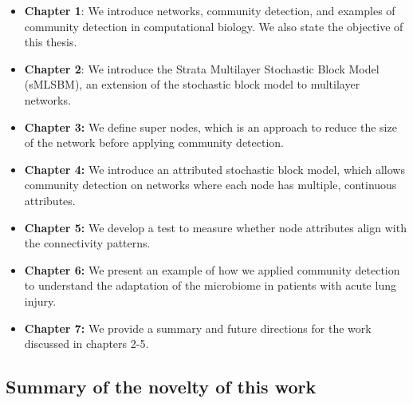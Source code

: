 \begin{itemize}
\item {\bf Chapter 1}: We introduce networks, community detection, and examples of community detection in computational biology. We also state the objective of this thesis.
\item {\bf Chapter 2}: We introduce the Strata Multilayer Stochastic Block Model (sMLSBM), an extension of the stochastic block model to multilayer networks. 
\item {\bf Chapter 3:} We define super nodes, which is an approach to reduce the size of the network before applying community detection.
\item {\bf Chapter 4:} We introduce an attributed stochastic block model, which allows community detection on networks where each node has multiple, continuous attributes.
\item {\bf Chapter 5:} We develop a test to measure whether node attributes align with the connectivity patterns.
\item {\bf Chapter 6:} We present an example of how we applied community detection to understand the adaptation of the microbiome in patients with acute lung injury.
\item {\bf Chapter 7:} We provide a summary and future directions for the work discussed in chapters 2-5.  
\end{itemize}

\subsection{Summary of the novelty of this work}

